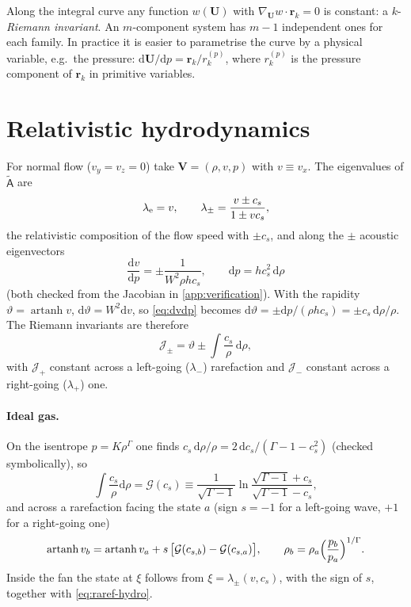 \documentclass[11pt,a4paper,oneside,openany]{book}
\theoremstyle{definition}
\theoremstyle{plain}
\theoremstyle{remark}
\newcommand{\dd}{\mathrm{d}}
\newcommand{\UU}{\bm{U}}
\newcommand{\VV}{\bm{V}}
\begin{document}
Along the integral curve any function $w(\UU)$ with $\nabla_{\UU}w\cdot\bm r_k=0$ is
constant: a $k$-\emph{Riemann invariant}. An $m$-component system has $m-1$ independent
ones for each family. In practice it is easier to parametrise the curve by a physical
variable, e.g.\ the pressure: $\dd\UU/\dd p=\bm r_k/r_k^{(p)}$, where $r_k^{(p)}$ is the
pressure component of $\bm r_k$ in primitive variables.

\section{Relativistic hydrodynamics}\label{sec:hydro-raref}

For normal flow ($v_y=v_z=0$) take $\VV=(\rho,v,p)$ with $v\equiv v_x$. The eigenvalues of
$\tilde{\mathsf A}$ are
\begin{equation}
\lambda_{\rm e}=v,\qquad \lambda_\pm=\frac{v\pm c_s}{1\pm vc_s},
\end{equation}
the relativistic composition of the flow speed with $\pm c_s$, and along the $\pm$ acoustic
eigenvectors
\begin{equation}\label{eq:dvdp}
\frac{\dd v}{\dd p}=\pm\frac{1}{W^2\rho hc_s},\qquad \dd p=hc_s^2\,\dd\rho
\end{equation}
(both checked from the Jacobian in \cref{app:verification}). With the rapidity
$\vartheta=\operatorname{artanh}v$, $\dd\vartheta=W^2\dd v$, so \eqref{eq:dvdp} becomes
$\dd\vartheta=\pm\dd p/(\rho hc_s)=\pm c_s\,\dd\rho/\rho$. The Riemann invariants are
therefore
\begin{equation}\label{eq:riemanninv}
\mathcal J_\pm=\vartheta\pm\int\frac{c_s}{\rho}\,\dd\rho ,
\end{equation}
with $\mathcal J_+$ constant across a left-going ($\lambda_-$) rarefaction and
$\mathcal J_-$ constant across a right-going ($\lambda_+$) one.

\paragraph{Ideal gas.} On the isentrope $p=K\rho^\Gamma$ one finds
$c_s\,\dd\rho/\rho=2\,\dd c_s/(\Gamma-1-c_s^2)$ (checked symbolically), so
\begin{equation}
\int\frac{c_s}{\rho}\dd\rho=\mathcal G(c_s)\equiv\frac{1}{\sqrt{\Gamma-1}}
\ln\frac{\sqrt{\Gamma-1}+c_s}{\sqrt{\Gamma-1}-c_s} ,
\end{equation}
and across a rarefaction facing the state $a$ (sign $s=-1$ for a left-going wave, $+1$ for a
right-going one)
\begin{equation}\label{eq:raref-hydro}
\operatorname{artanh}v_b=\operatorname{artanh}v_a+s\,\bigl[\mathcal G(c_{s,b})-\mathcal G(c_{s,a})\bigr],
\qquad \rho_b=\rho_a\Bigl(\frac{p_b}{p_a}\Bigr)^{1/\Gamma}.
\end{equation}
Inside the fan the state at $\xi$ follows from $\xi=\lambda_\pm(v,c_s)$, with the sign of $s$, together with
\eqref{eq:raref-hydro}.
\end{document}
